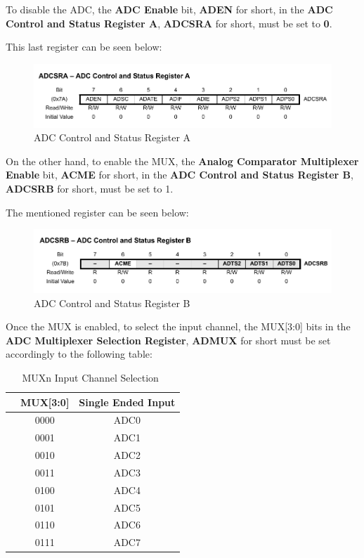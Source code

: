 To disable the ADC, the \textbf{ADC Enable} bit, \textbf{ADEN} for short, in the \textbf{ADC Control and Status Register A}, \textbf{ADCSRA} for short, must be set to \textbf{0}. \medskip

This last register can be seen below:

\begin{figure}[H]
    \centering
    \includegraphics[width = \textwidth]{Graphics/MICROS/Practice 3/DATASHEET/ADCSRA.pdf}
    \caption{ADC Control and Status Register A~\autocite{ATMEGA328P}}
    \label{fig:ADCSRA}
\end{figure}


On the other hand, to enable the MUX, the \textbf{Analog Comparator Multiplexer Enable} bit, \textbf{ACME} for short, in the \textbf{ADC Control and Status Register B}, \textbf{ADCSRB} for short, must be set to 1.\medskip

The mentioned register can be seen below:

\begin{figure}[H]
    \centering
    \includegraphics[width = \textwidth]{Graphics/MICROS/Practice 3/DATASHEET/ADCSRB.pdf}
    \caption{ADC Control and Status Register B~\autocite{ATMEGA328P}}
    \label{fig:ADCSRB}
\end{figure}


Once the MUX is enabled, to select the input channel, the MUX[3:0] bits in the \textbf{ADC Multiplexer Selection Register}, \textbf{ADMUX} for short must be set accordingly to the following table:

\begin{table}[H]
        \centering
        \begin{tabular}[t]{lcc}
            \toprule
            & \textbf{MUX[3:0]} & \textbf{Single Ended Input} \\
            \midrule
            & 0000 & ADC0  \\
            & 0001 & ADC1  \\
            & 0010 & ADC2  \\
            & 0011 & ADC3  \\
            & 0100 & ADC4  \\
            & 0101 & ADC5  \\
            & 0110 & ADC6  \\
            & 0111 & ADC7  \\
            \bottomrule
        \end{tabular}
        \caption{MUXn Input Channel Selection~\autocite{ATMEGA328P}}
        \label{table:MUXN_SELECTION}
\end{table}

